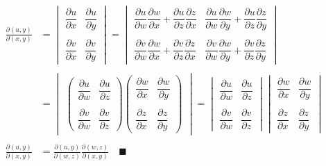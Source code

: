 \documentclass[../../../Main.tex]{subfiles}
\begin{document}
\begin{align*}
    \frac{\partial (u,y)}{\partial (x,y)}&=\begin{vmatrix}
        \dfrac{\partial u}{\partial x} & \dfrac{\partial u}{\partial y}
        \\\\
        \dfrac{\partial v}{\partial x} & \dfrac{\partial v}{\partial y}
     \end{vmatrix}=
     \begin{vmatrix}
        \dfrac{\partial u}{\partial w} \dfrac{\partial w}{\partial x}+ \dfrac{\partial u}{\partial z} \dfrac{\partial z}{\partial x}  & \dfrac{\partial u}{\partial w}\dfrac{\partial w}{\partial y} + \dfrac{\partial u}{\partial z} \dfrac{\partial z}{\partial y}  
        \\\\
        \dfrac{\partial v}{\partial w}\dfrac{\partial w}{\partial x} + \dfrac{\partial v}{\partial z} \dfrac{\partial z}{\partial x}   & \dfrac{\partial v}{\partial w}\dfrac{\partial w}{\partial y} +\dfrac{\partial v}{\partial z} \dfrac{\partial z}{\partial y} 
     \end{vmatrix}   
     \\\\
     &=\begin{vmatrix}
        \begin{pmatrix}
            \dfrac{\partial u}{\partial w} & \dfrac{\partial u}{\partial z} 
            \\\\
            \dfrac{\partial v}{\partial w}  & \dfrac{\partial v}{\partial z} 
        \end{pmatrix}
        \begin{pmatrix}
            \dfrac{\partial w}{\partial x} & \dfrac{\partial w}{\partial y} 
            \\\\
            \dfrac{\partial z}{\partial x}  & \dfrac{\partial z}{\partial y} 
        \end{pmatrix}
     \end{vmatrix}=
     \begin{vmatrix}
        \dfrac{\partial u}{\partial w} & \dfrac{\partial u}{\partial z} 
        \\\\
        \dfrac{\partial v}{\partial w}  & \dfrac{\partial v}{\partial z} 
     \end{vmatrix}
     \begin{vmatrix}
        \dfrac{\partial w}{\partial x} & \dfrac{\partial w}{\partial y} 
        \\\\
        \dfrac{\partial z}{\partial x}  & \dfrac{\partial z}{\partial y} 
     \end{vmatrix}
     \\\\
     \frac{\partial (u,y)}{\partial (x,y)}&=\frac{\partial (u,y)}{\partial (w,z)}\frac{\partial (w,z)}{\partial (x,y)} \quad \blacksquare
\end{align*}
\end{document}

